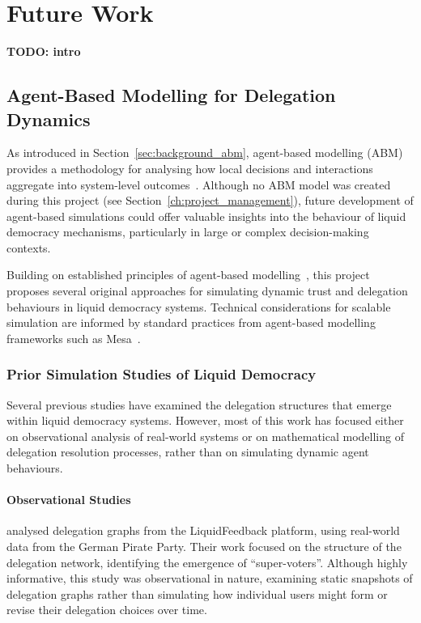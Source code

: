 \chapter{Future Work}

\textbf{TODO: intro}

\section{Agent-Based Modelling for Delegation Dynamics}

As introduced in Section~\ref{sec:background_abm}, agent-based modelling (ABM) provides a methodology for analysing how local decisions and interactions aggregate into system-level outcomes~\citep{bonabeau2002agent}. Although no ABM model was created during this project (see Section~\ref{ch:project_management}), future development of agent-based simulations could offer valuable insights into the behaviour of liquid democracy mechanisms, particularly in large or complex decision-making contexts.

Building on established principles of agent-based modelling~\citep{bonabeau2002agent}, this project proposes several original approaches for simulating dynamic trust and delegation behaviours in liquid democracy systems. Technical considerations for scalable simulation are informed by standard practices from agent-based modelling frameworks such as Mesa~\citep{kazil_utilizing_2020}.

\subsection{Prior Simulation Studies of Liquid Democracy}

Several previous studies have examined the delegation structures that emerge within liquid democracy systems. However, most of this work has focused either on observational analysis of real-world systems or on mathematical modelling of delegation resolution processes, rather than on simulating dynamic agent behaviours.

\subsubsection{Observational Studies}

\citet{kling2015votingbehaviourpoweronline} analysed delegation graphs from the LiquidFeedback platform, using real-world data from the German Pirate Party. Their work focused on the structure of the delegation network, identifying the emergence of ``super-voters''. Although highly informative, this study was observational in nature, examining static snapshots of delegation graphs rather than simulating how individual users might form or revise their delegation choices over time.

